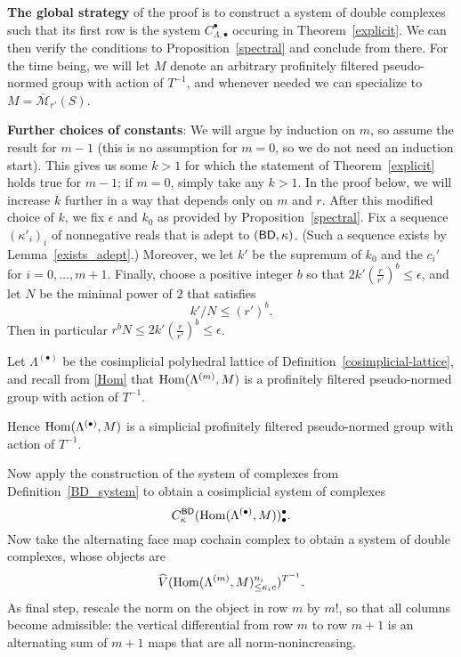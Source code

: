 \textbf{The global strategy}
of the proof is to construct a system of double complexes
such that its first row is the system $C_{\Lambda, \bullet}^\bullet$
occuring in Theorem~\ref{explicit}.
We can then verify the conditions to Proposition~\ref{spectral}
and conclude from there.
For the time being, we will let $M$ denote
an arbitrary profinitely filtered pseudo-normed group with action of $T^{-1}$,
and whenever needed we can specialize to $M = \overline{\mathcal M}_{r'}(S)$.

\textbf{Further choices of constants}:
We will argue by induction on $m$, so assume the result for $m-1$
(this is no assumption for $m=0$, so we do not need an induction start).
This gives us some $k>1$ for which the statement of Theorem~\ref{explicit} holds true for $m-1$;
if $m=0$, simply take any $k>1$.
In the proof below, we will increase $k$ further in a way that depends only on $m$ and $r$.
After this modified choice of $k$, we fix $\epsilon$ and $k_0$ as provided by Proposition~\ref{spectral}.
Fix a sequence $(\kappa'_i)_i$ of nonnegative reals that is adept to $(\mathsf{BD}, \kappa)$.
(Such a sequence exists by Lemma~\ref{exists_adept}.)
Moreover, we let $k'$ be the supremum of $k_0$ and the $c_i'$ for $i=0,\ldots,m+1$.
Finally, choose a positive integer $b$ so that $2k'(\tfrac r{r'})^b\leq \epsilon$,
and let $N$ be the minimal power of $2$ that satisfies
\[
  k'/N\leq (r')^b.
\]
Then in particular $r^bN\leq 2k'(\tfrac{r}{r'})^b\leq \epsilon$.

\begin{definition}
  \label{double_complex}
  \leanok
  Let $\Lambda^{(\bullet)}$ be the cosimplicial polyhedral lattice of
  Definition~\ref{cosimplicial-lattice},
  and recall from \ref{Hom} that $\operatorname{Hom}(\Lambda^{(m)}, M)$ is a
  profinitely filtered pseudo-normed group with action of $T^{-1}$.

  Hence $\operatorname{Hom}(\Lambda^{(\bullet)}, M)$ is a simplicial
  profinitely filtered pseudo-normed group with action of $T^{-1}$.

  Now apply the construction of the system of complexes from
  Definition~\ref{BD_system} to obtain a cosimplicial system of complexes
  \[
    C^{\mathsf{BD}}_{\kappa}(\operatorname{Hom}(\Lambda^{(\bullet)}, M))_\bullet^\bullet.
  \]
  Now take the alternating face map cochain complex
  to obtain a system of double complexes, whose objects are
  \[
    \widehat{V}(\operatorname{Hom}(\Lambda^{(m)},M)_{\leq \kappa_ic}^{n_i})^{T^{-1}}.
  \]
  As final step, rescale the norm on the object in row $m$ by $m!$,
  so that all columns become admissible:
  the vertical differential from row $m$ to row $m+1$
  is an alternating sum of $m+1$ maps that are all norm-nonincreasing.
\end{definition}

